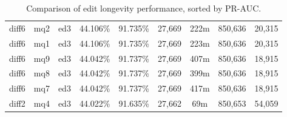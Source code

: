 \begin{sidewaystable}[!ph]
\begin{center}
\begin{tabular}{|c|c|c||c|c||c|c|c|c|}
diff6 & mq2 & ed3 & 44.106\% & 91.735\% & 27,669 & 222m & 850,636 & 20,315 \\
diff6 & mq1 & ed3 & 44.106\% & 91.735\% & 27,669 & 223m & 850,636 & 20,315 \\
diff6 & mq9 & ed3 & 44.042\% & 91.737\% & 27,669 & 407m & 850,636 & 18,915 \\
diff6 & mq8 & ed3 & 44.042\% & 91.737\% & 27,669 & 399m & 850,636 & 18,915 \\
diff6 & mq7 & ed3 & 44.042\% & 91.737\% & 27,669 & 417m & 850,636 & 18,915 \\
diff2 & mq4 & ed3 & 44.022\% & 91.635\% & 27,662 & 69m & 850,653 & 54,059 \\
\hline
\end{tabular}
\end{center}
\caption{Comparison of edit longevity performance,
    sorted by PR-AUC.}
\label{tab:editshoutC}
\end{sidewaystable}
\clearpage

